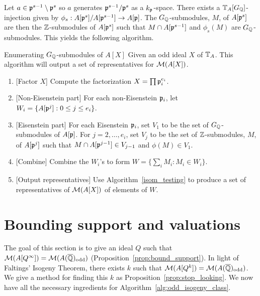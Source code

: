\documentclass[11pt, proquest]{uwthesis}
\begin{document}
Let $a\in \mathfrak{p}^{s-1}\setminus \mathfrak{p}^s$ so $a$ generates $\mathfrak{p}^{s-1}/\mathfrak{p}^s$ as a
$k_{\mathfrak{p}}$-space. There exists a $\mathbb{T}_A[G_{\mathbb{Q}}]$-injection given by
$\phi_s:A[\mathfrak{p}^s]/A[\mathfrak{p}^{s-1}]\to A[\mathfrak{p}]$. The $G_{\mathbb{Q}}$-submodules, $M$, of
$A[\mathfrak{p}^s]$ are then the $\mathbb{Z}$-submodules of $A[\mathfrak{p}^s]$ such that $M\cap
A[\mathfrak{p}^{s-1}]$ and $\phi_s(M)$ are $G_{\mathbb{Q}}$-submodules. This yields the following
algorithm.

\begin{algorithm}{Enumerating $G_{\mathbb{Q}}$-submodules of {$A[X]$}}
    Given an odd ideal $X$ of $\mathbb{T}_A$. This algorithm will output a set of
    representatives for $\mathcal{M}(A[X])$.
    \begin{enumerate}
        \item{} [Factor $X$]
            Compute the factorization $X=\prod \mathfrak{p}_i ^{e_i}$.
        \item{} [Non-Eisenstein part]
            For each non-Eisenstein $\mathfrak{p}_i$, let $W_i=\{A[\mathfrak{p}^j]: 0 \leq j
            \leq e_i\}$.
        \item{} [Eisenstein part]
            For each Eisenstein $\mathfrak{p}_i$, set $V_1$ to be the set of
            $G_{\mathbb{Q}}$-submodules of $A[\mathfrak{p}]$. For $j=2,\ldots,e_i$, set $V_j$ to
            be the set of $\mathbb{Z}$-submodules, $M$, of $A[\mathfrak{p}^j]$ such that $M\cap
            A[\mathfrak{p}^{j-1}]\in V_{j-1}$ and $\phi(M)\in V_1$.
        \item{} [Combine]
            Combine the $W_i$'s to form $W=\{\sum_i M_i: M_i \in W_i\}$.
        \item{} [Output representatives]
            Use Algorithm~\ref{isom_testing} to produce a set of
            representatives of $\mathcal{M}(A[X])$ of elements of $W$.
    \end{enumerate}
\end{algorithm}

\section{Bounding support and valuations}%
\label{sec:bounding_support_and_valuations}

The goal of this section is to give an ideal $Q$ such that
$\mathcal{M}(A[Q^\infty])=\mathcal{M}(A(\overline{\mathbb{Q}})_{\mathrm{odd}})$ (Proposition~\ref{prop:bound_support}). In
light of Faltings' Isogeny Theorem, there exists $k$ such that
$\mathcal{M}(A[Q^k])=\mathcal{M}(A(\overline{\mathbb{Q}})_{\mathrm{odd}})$. We give a method for finding this $k$ as
Proposition~\ref{prop:stop_looking}. We now have all the necessary ingredients
for Algorithm~\ref{alg:odd_isogeny_class}.
\end{document}
